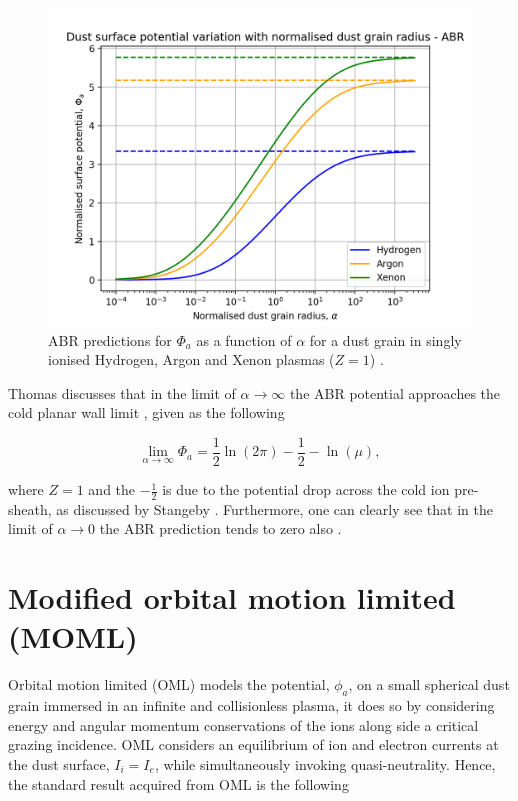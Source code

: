 \documentclass{article}
\begin{document}
\begin{figure}[H]
\centering
\includegraphics[width=\linewidth]{Output/ABRgraph.jpeg}
\caption{ABR predictions for $\Phi_a$ as a function of $\alpha$ for a dust grain in singly ionised Hydrogen, Argon and Xenon plasmas ($Z=1$) \cite{ABR} \cite{Thomas}.}
\label{ABR} 
\end{figure}

Thomas discusses that in the limit of $\alpha \to \infty$ the ABR potential approaches
the cold planar wall limit \cite{Thomas}, given as the following 

\begin{equation}\label{eq:ABRLim}
\lim_{\alpha \to \infty} \Phi_a = \frac{1}{2}\ln{\left(2 \pi \right)} - \frac{1}{2} - \ln{\left(\mu \right)},
\end{equation}

\smallskip

\noindent where $Z = 1$ and the $-\frac{1}{2}$ is due to the potential drop across the cold ion pre-sheath,
as discussed by Stangeby \cite{Stangeby1986} \cite{Stangeby2000}. Furthermore, one can clearly see that in the limit
of $\alpha \to 0$ the ABR prediction tends to zero also \cite{ABR}.

\section{Modified orbital motion limited (MOML)}

\smallskip

Orbital motion limited (OML) models the potential, $\phi_a$, on a small spherical
dust grain immersed in an infinite and collisionless plasma, it does so by considering
energy and angular momentum conservations of the ions along side a critical grazing incidence.
OML considers an equilibrium of ion and electron currents at the dust 
surface, $I_i = I_e$, while simultaneously invoking quasi-neutrality.
Hence, the standard result acquired from OML is 
the following
\end{document}
